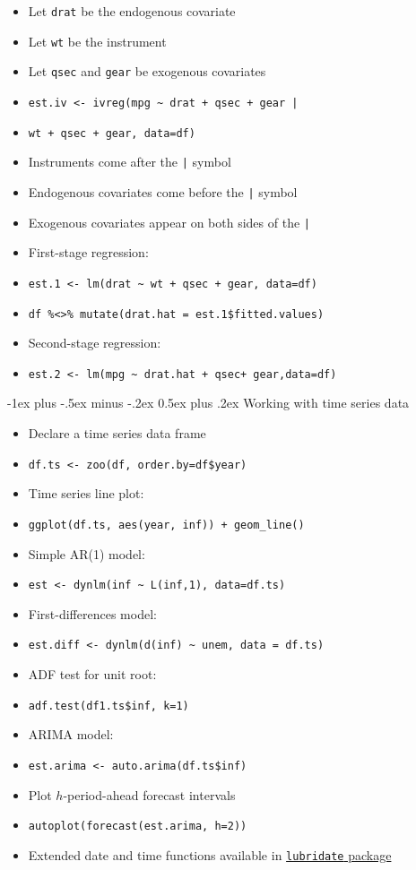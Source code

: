 \documentclass[10pt,landscape]{article}
\makeatletter
\renewcommand{\section}{\@startsection{section}{1}{0mm}%
                                {-1ex plus -.5ex minus -.2ex}%
                                {0.5ex plus .2ex}%
                                {\normalfont\large\bfseries}}
\makeatother
\begin{document}
\begin{multicols}{3}
\begin{itemize}
    \item Let \verb!drat! be the endogenous covariate
    \item Let \verb!wt! be the instrument
    \item Let \verb!qsec! and \verb!gear! be exogenous covariates
    \item[] \verb!est.iv <- ivreg(mpg ~ drat + qsec + gear | !
    \item[] \verb!wt + qsec + gear, data=df)!
    \item Instruments come after the \verb!|! symbol
    \item Endogenous covariates come before the \verb!|! symbol
    \item Exogenous covariates appear on both sides of the \verb!|!
    \item First-stage regression:
    \item[] \verb!est.1 <- lm(drat ~ wt + qsec + gear, data=df)!
    \item[] \verb!df %<>% mutate(drat.hat = est.1$fitted.values)!
    \item Second-stage regression:
    \item[] \verb!est.2 <- lm(mpg ~ drat.hat + qsec+ gear,data=df)!
\end{itemize}




\section{Working with time series data}

\smallskip{}

\begin{itemize}
    \item Declare a time series data frame
    \item[] \verb!df.ts <- zoo(df, order.by=df$year)!
    \item Time series line plot:
    \item[] \verb!ggplot(df.ts, aes(year, inf)) + geom_line()!
    \item Simple AR(1) model:
    \item[] \verb!est <- dynlm(inf ~ L(inf,1), data=df.ts)!
    \item First-differences model:
    \item[] \verb!est.diff <- dynlm(d(inf) ~ unem, data = df.ts)!
    \item ADF test for unit root:
    \item[] \verb!adf.test(df1.ts$inf, k=1)!
    \item ARIMA model:
    \item[] \verb!est.arima <- auto.arima(df.ts$inf)!
    \item Plot $h$-period-ahead forecast intervals
    \item[] \verb!autoplot(forecast(est.arima, h=2))!
    \item Extended date and time functions available in \href{https://evoldyn.gitlab.io/evomics-2018/ref-sheets/R_lubridate.pdf}{\texttt{lubridate} package}
\end{itemize}





\end{multicols}
\end{document}
